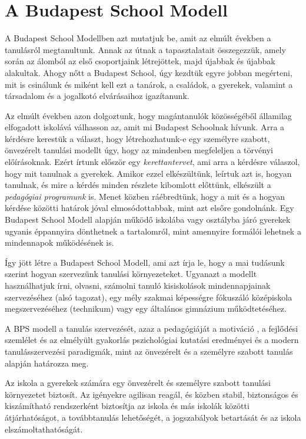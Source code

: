 \hypertarget{a-budapest-school-modell}{%
\section{A Budapest School Modell}\label{a-budapest-school-modell}}

A Budapest School Modellben azt mutatjuk be, amit az elmúlt években a
tanulásról megtanultunk. Annak az útnak a tapasztalatait összegezzük,
amely során az álomból az első csoportjaink létrejöttek, majd újabbak és
újabbak alakultak. Ahogy nőtt a Budapest School, úgy kezdtük egyre
jobban megérteni, mit is csinálunk és miként kell ezt a tanárok, a
családok, a gyerekek, valamint a társadalom és a jogalkotó elvárásaihoz
igazítanunk.

Az elmúlt években azon dolgoztunk, hogy magántanulók közösségéből
államilag elfogadott iskolává válhasson az, amit mi Budapest Schoolnak
hívunk. Arra a kérdésre kerestük a választ, hogy létrehozhatunk-e egy
személyre szabott, önvezérelt tanulási modellt úgy, hogy az mindenben
megfeleljen a törvényi előírásoknak. Ezért írtunk először egy
\emph{kerettantervet}, ami arra a kérdésre válaszol, hogy mit tanulnak a
gyerekek. Amikor ezzel elkészültünk, leírtuk azt is, hogyan tanulnak, és
mire a kérdés minden részlete kibomlott előttünk, elkészült a
\emph{pedagógiai programunk} is. Menet közben ráébredtünk, hogy a mit és
a hogyan kérdése közötti határok jóval elmosódottabbak, mint azt elsőre
gondolnánk. Egy Budapest School Modell alapján működő iskolába vagy
osztályba járó gyerekek ugyanis éppannyira dönthetnek a tartalomról,
mint amennyire formálói lehetnek a mindennapok működésének is.

Így jött létre a Budapest School Modell, ami azt írja le, hogy a mai
tudásunk szerint hogyan szervezünk tanulási környezeteket. Ugyanazt a
modellt használhatjuk írni, olvasni, számolni tanuló kisiskolások
mindennapjainak szervezéséhez (alsó tagozat), egy mély szakmai
képességre fókuszáló középiskola megszervezéséhez (technikum) vagy egy
általános\break
gimnázium működtetéséhez.

A BPS modell a tanulás szervezését, azaz a pedagógiáját a motiváció
{\autocite{Pink2011}}, a fejlődési szemlélet {\autocite{Dweck2006}} és
az elmélyült gyakorlás {\autocite{Ericsson2016}} pszichológiai kutatási
eredményei és a modern tanulásszervezési paradigmák, mint az önvezérelt
{\autocite{Mitra2012}} és a személyre szabott {\autocite{Khan2012}}
tanulás alapján határozza meg.

Az iskola a gyerekek számára egy önvezérelt és személyre szabott
tanulási környezetet biztosít. Az igényekre agilisan reagál, és közben
stabil, biztonságos és kiszámítható rendszerként biztosítja az iskola és
más iskolák közötti átjárhatóságot, a továbbtanulás lehetőségét, a
jogszabályok betartását és az iskola elszámoltathatóságát.

